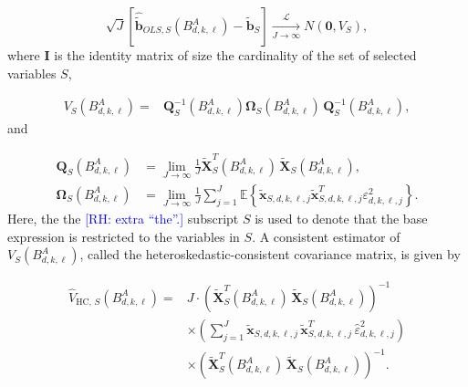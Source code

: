 \documentclass[10pt,a4paper,oneside]{article}
\newcommand{\E}{\mathbb{E}}
\newcommand{\rh}[1]{\textcolor{blue}{\textsf{[RH: #1]}}}
\begin{document}
$$
    \sqrt{J}\left[\hat{\tilde{\mathbf{b}}}_{OLS,S} \left( B^A_{d, k, \ell} \right) - \tilde{\mathbf{b}}_S \right]  \xrightarrow[J \rightarrow \infty]{\mathcal{L}} N(\mathbf{0}, V_S),
$$
where $\mathbf{I}$ is the identity matrix of size the cardinality of the set of selected variables $S$,

\begin{align*}
    V_{S} \left( B^A_{d, k, \ell} \right)
    ={} &
    \mathbf{Q}^{-1}_S\left(B^A_{d,k,\ell}\right)\mathbf{\Omega}_S\left(B^A_{d,k,\ell}\right) \, \mathbf{Q}^{-1}_S\left(B^A_{d,k,\ell}\right),
\end{align*}
and

\begin{align*}
    \mathbf{Q}_S\left(B^A_{d,k,\ell}\right)      & = \lim_{J \rightarrow \infty} \frac{1}{J}\tilde{\mathbf{X}}_{S}^T(B^A_{d,k,\ell})
    \,\tilde{\mathbf{X}}_{S}(B^A_{d,k,\ell}) ,                                                                                                                                                                                         \\
    \mathbf{\Omega}_S\left(B^A_{d,k,\ell}\right) & = \lim_{J \rightarrow \infty} \frac{1}{J} \sum^J_{j = 1} \E \left \{ \tilde{\mathbf{x}}_{S,d,k,\ell,j} \tilde{\mathbf{x}}_{S,d,k,\ell,j}^T \varepsilon^2_{d, k, \ell, j} \right\}.
\end{align*}
Here, the the \rh{extra ``the''.} subscript $S$ is used to denote that the base expression is restricted to the variables in $S$. A consistent estimator of $V_S\left( B^A_{d,k,\ell} \right)$, called the heteroskedastic-consistent covariance matrix, is given by

\begin{align*}
    \hat{V}_{\mathrm{HC},\,S} \left( B^A_{d, k, \ell} \right)
    ={} &
    J \cdot \left(\tilde{\mathbf{X}}_{S}^T(B^A_{d,k,\ell})
    \,\tilde{\mathbf{X}}_{S}(B^A_{d,k,\ell})\right)^{-1} \\
        & \times
    \left(\sum_{j=1}^J
    \tilde{\mathbf{x}}_{S,d,k,\ell,j}
    \,\tilde{\mathbf{x}}_{S,d,k,\ell,j}^T\,
    \hat{\varepsilon}^2_{d,k,\ell,j}\right)              \\
        & \times
    \left(\tilde{\mathbf{X}}_{S}^T(B^A_{d,k,\ell})
    \,\tilde{\mathbf{X}}_{S}(B^A_{d,k,\ell})\right)^{-1}.
\end{align*}
\end{document}
